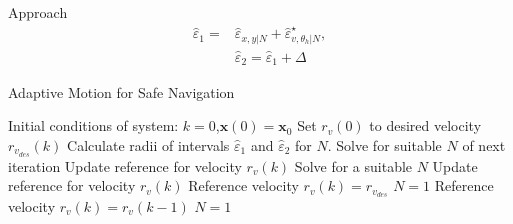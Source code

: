 \begin{section}{Approach}
\begin{equation}
	\end{equation}
	\begin{equation}
	\begin{split}
	    \hat{\varepsilon}_1=&\hat{\varepsilon}_{x,y|N} +\hat{\varepsilon}_{v,\theta_h|N}^{\star},\\ &\hat{\varepsilon}_2=\hat{\varepsilon}_1+\Delta \nonumber	    
	\end{split}
	\end{equation}


\begin{algorithm}
   \caption{Adaptive Motion for Safe Navigation} 
   \label{alg:adapt_motion} 
    \begin{algorithmic}[1]
	\State Initial conditions of system: $k=0$,$\bm{x}(0)=\bm{x}_0$
	\State Set $r_v(0)$ to desired velocity $r_{v_{des}}(k)$
        \State {}
        \State Calculate radii of intervals $\hat{\varepsilon}_1$ and $\hat{\varepsilon}_2$ for $N$.
            \State Solve for suitable $N$ of next iteration
            \State Update reference for velocity $r_v(k)$
        \Else
                \State Solve for a suitable $N$
                \State Update reference for velocity $r_v(k)$
            \Else
                    \State Reference velocity $r_v(k)=r_{v_{des}}$
                    \State $N = 1$
                \Else
                    \State Reference velocity $r_v(k) = r_v(k-1)$
                    \State $N = 1$
                \EndIf
            \EndIf
        \EndIf
    \EndWhile
	\end{algorithmic}
\end{algorithm}



\end{section} 